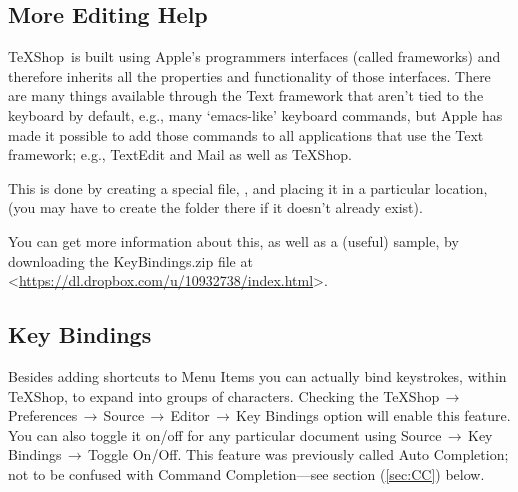 \documentclass[letterpaper,11pt]{article}
\newcommand{\TS}{\textsf{\TeX Shop}}
\newcommand{\cmd}[1]{\textsf{#1}}
\newcommand{\mnu}[1]{\textsf{#1}}
\newcommand{\To}{\,\(\to\)\,}
\begin{document}
\subsection{More Editing Help}

\TS\ is built using Apple's programmers interfaces (called frameworks) and therefore inherits all the properties and functionality of those interfaces. There are many things available through the Text framework that aren't tied to the keyboard by default, e.g., many `\cmd{emacs}-like' keyboard commands, but Apple has made it possible to add those commands to all applications that use the Text framework; e.g., \textsf{TextEdit} and \textsf{Mail} as well as \TS.

This is done by creating a special file, , and placing it in a particular location,  (you may have to create the  folder there if it doesn't already exist).

You can get more information about this, as well as a (useful) sample, by downloading the \textsf{KeyBindings.zip} file at <\url{https://dl.dropbox.com/u/10932738/index.html}>.


\subsection{Key Bindings}

Besides adding shortcuts to Menu Items you can actually bind keystrokes, within \TS, to expand into groups of characters. Checking the \mnu{TeXShop}\To\mnu{Preferences}\To\mnu{Source}\To\mnu{Editor}\To\mnu{Key Bindings} option will enable this feature. You can also toggle it on/off for any particular document using \mnu{Source}\To\mnu{Key Bindings}\To\mnu{Toggle On/Off}. This feature was previously called Auto Completion; not to be confused with Command Completion---see section (\ref{sec:CC}) below.
\end{document}
